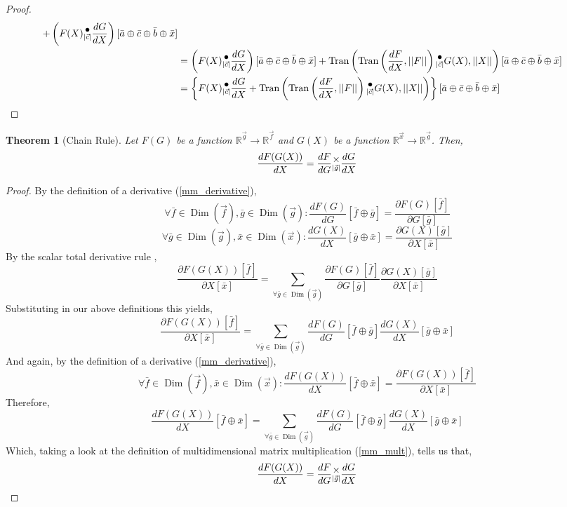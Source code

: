 \documentclass[12pt]{book}
\theoremstyle{plain}
\newtheorem{theorem}{Theorem}[chapter]
\theoremstyle{definition}
\theoremstyle{ppart}
\theoremstyle{case}
\theoremstyle{solution}
\DeclareMathOperator{\Dim}{Dim}
\DeclareMathOperator{\Tran}{Tran}
\newcommand{\mmult}[1]{\text{\raisebox{1ex}{$\underset{#1}{\times}$}}}
\newcommand{\dmult}[1]{\text{\raisebox{1ex}{$\underset{#1}{\,\bullet\,}$}}}
\newcommand{\shape}[1]{\left|#1\right|}
\begin{document}
\begin{landscape}
\begin{proof}
\begin{align*}
    + \left(F(X) \dmult{\shape{\vec{c}}} \frac{dG}{dX}\right)[\bar{a} \oplus \bar{c} \oplus \bar{b} \oplus \bar{x}] \\
  &= \left(F(X) \dmult{\shape{\vec{c}}} \frac{dG}{dX}\right)[\bar{a} \oplus \bar{c} \oplus \bar{b} \oplus \bar{x}]
    + \Tran\left(\Tran\left(\frac{dF}{dX}, \shape{\shape{F}}\right) \dmult{\shape{\vec{c}}} G(X), \shape{\shape{X}}\right) [\bar{a} \oplus \bar{c} \oplus \bar{b} \oplus \bar{x}] \\
  &= \left\{ F(X) \dmult{\shape{\vec{c}}} \frac{dG}{dX}
    + \Tran\left(\Tran\left(\frac{dF}{dX}, \shape{\shape{F}}\right) \dmult{\shape{\vec{c}}} G(X), \shape{\shape{X}}\right) \right\}[\bar{a} \oplus \bar{c} \oplus \bar{b} \oplus \bar{x}]
\end{align*}
\end{proof}
\end{landscape}

\begin{theorem}[Chain Rule]
\label{mmm_chain_rule}
Let $F(G)$ be a function $\mathbb{R}^{\vec{g}} \rightarrow \mathbb{R}^{\vec{f}}$
and $G(X)$ be a function $\mathbb{R}^{\vec{x}} \rightarrow \mathbb{R}^{\vec{g}}$.
Then,
\[
\frac{dF(G(X))}{dX} = \frac{dF}{dG} \mmult{\shape{\vec{g}}} \frac{dG}{dX}
\]
\end{theorem}
\begin{proof}
By the definition of a derivative (\ref{mm_derivative}),
\[
\forall \bar{f} \in \Dim(\vec{f}), \bar{g} \in \Dim(\vec{g}):
\frac{dF(G)}{dG}[\bar{f} \oplus \bar{g}]
= \frac{\partial F(G)[\bar{f}]}{\partial G[\bar{g}]}
\]
\[
\forall \bar{g} \in \Dim(\vec{g}), \bar{x} \in \Dim(\vec{x}):
\frac{dG(X)}{dX}[\bar{g} \oplus \bar{x}]
= \frac{\partial G(X)[\bar{g}]}{\partial X[\bar{x}]}
\]
By the scalar total derivative rule \cite{wiki:totalderiv},
\[
\frac{\partial F(G(X))[\bar{f}]}{\partial X[\bar{x}]}
= \sum_{\forall \bar{g} \in \Dim(\vec{g})} 
\frac{\partial F(G)[\bar{f}]}{\partial G[\bar{g}]}
\frac{\partial G(X)[\bar{g}]}{\partial X[\bar{x}]}
\]
Substituting in our above definitions this yields,
\[
\frac{\partial F(G(X))[\bar{f}]}{\partial X[\bar{x}]}
= \sum_{\forall \bar{g} \in \Dim(\vec{g})} 
\frac{dF(G)}{dG}[\bar{f} \oplus \bar{g}]
\frac{dG(X)}{dX}[\bar{g} \oplus \bar{x}]
\]
And again, by the definition of a derivative (\ref{mm_derivative}),
\[
\forall \bar{f} \in \Dim(\vec{f}), \bar{x} \in \Dim(\vec{x}):
\frac{dF(G(X))}{dX}[\bar{f} \oplus \bar{x}]
= \frac{\partial F(G(X))[\bar{f}]}{\partial X[\bar{x}]}
\]
Therefore,
\[
\frac{dF(G(X))}{dX}[\bar{f} \oplus \bar{x}]
= \sum_{\forall \bar{g} \in \Dim(\vec{g})} 
\frac{dF(G)}{dG}[\bar{f} \oplus \bar{g}]
\frac{dG(X)}{dX}[\bar{g} \oplus \bar{x}]
\]
Which, taking a look at the definition of multidimensional matrix multiplication
(\ref{mm_mult}), tells us that,
\[
\frac{dF(G(X))}{dX} = \frac{dF}{dG} \mmult{\shape{\vec{g}}} \frac{dG}{dX}
\]
\end{proof}
\end{document}
